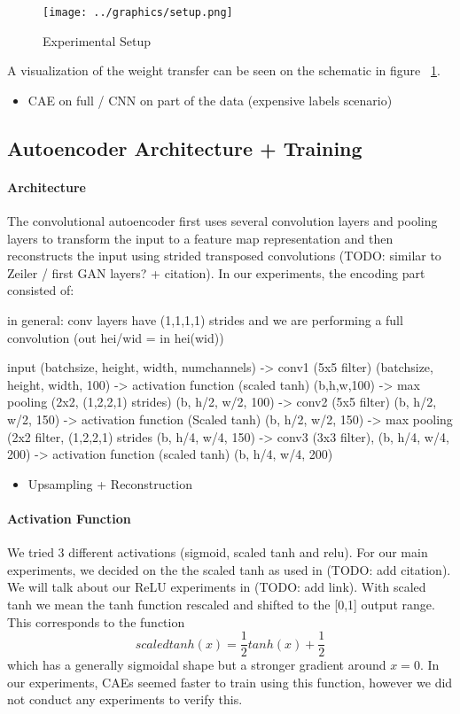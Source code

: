 \documentclass{article}
\begin{document}
  \begin{figure}[h]
    \centering
    \texttt{[image: ../graphics/setup.png]}
    \caption{Experimental Setup}
    \label{fig:experimental_setup}
  \end{figure}

  A visualization of the weight transfer can be seen on the schematic in figure ~\ref{fig:experimental_setup}. 

  \begin{itemize}
    \item CAE on full / CNN on part of the data (expensive labels scenario)
  \end{itemize}

  \subsection{Autoencoder Architecture + Training}

    \paragraph{Architecture}
    The convolutional autoencoder first uses several convolution layers and pooling layers to transform the input to a feature map representation and then reconstructs the input using strided transposed convolutions (TODO: similar to Zeiler / first GAN layers? + citation). In our experiments, the encoding part consisted of:

    in general: conv layers have (1,1,1,1) strides and we are performing a full convolution (out hei/wid = in hei(wid))

    input (batchsize, height, width, numchannels) -> conv1 (5x5 filter) (batchsize, height, width, 100) -> activation function (scaled tanh) (b,h,w,100) -> max pooling (2x2, (1,2,2,1) strides) (b, h/2, w/2, 100) -> conv2 (5x5 filter) (b, h/2, w/2, 150) -> activation function (Scaled tanh) (b, h/2, w/2, 150) -> max  pooling (2x2 filter, (1,2,2,1) strides (b, h/4, w/4, 150) -> conv3 (3x3 filter), (b, h/4, w/4, 200) -> activation function (scaled tanh) (b, h/4, w/4, 200) 

    \begin{itemize}
      \item Upsampling + Reconstruction
    \end{itemize}

    \paragraph{Activation Function} We tried 3 different activations (sigmoid, scaled tanh and relu). For our main experiments, we decided on the the scaled tanh as used in (TODO: add citation). We will talk about our ReLU experiments in (TODO: add link). With scaled tanh we mean the tanh function rescaled and shifted to the [0,1] output range. This corresponds to the function $$scaledtanh(x) = \frac{1}{2}tanh(x) + \frac{1}{2}$$ which has a generally sigmoidal shape but a stronger gradient around $x = 0$. In our experiments, CAEs seemed faster to train using this function, however we did not conduct any experiments to verify this.
\end{document}
